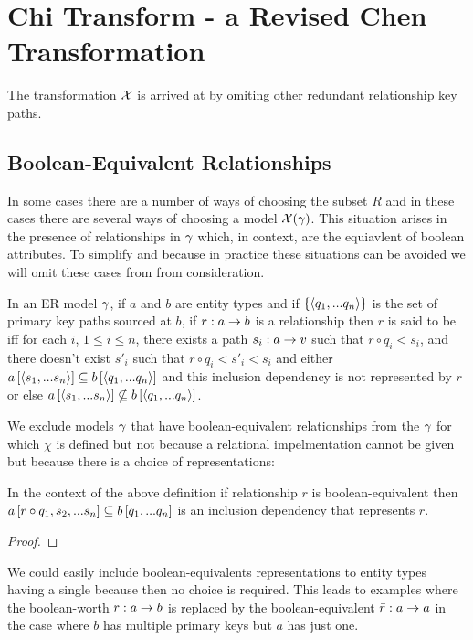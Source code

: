\section{Chi Transform - a Revised Chen Transformation}

\begin{oldtt}
The transformation $\mathcal{X}$ is arrived at by omiting other redundant relationship key paths. 
\end{oldtt}

\subsection{Boolean-Equivalent Relationships}

In some cases there are a number of ways of choosing the subset $R$ and  in these cases there are several ways of choosing
a model $\mathcal{X}(\gamma)$. This situation arises in the presence of relationships in $\gamma$ which, in context, are the equiavlent of boolean attributes. To simplify and because in practice these situations can be avoided we will omit these cases from from consideration. 
\begin{definition}
In an  ER model $\gamma$, if $a$ and $b$ are entity types and if $\left\{\langle q_1,...q_n\rangle\right\}$ is the set of primary key paths sourced at $b$, if $r: a \rightarrow b$ is a relationship then $r$ is said to be  
iff for each $i$, $1 \leq i \leq n$, there exists a path $s_i: a \rightarrow v$ such that $r \circ q_i < s_i$,
and there doesn't exist $s'_i$ such that $r \circ q_i < s'_i <s_i$ and  either
$a\left[\langle s_1,...s_n\rangle\right]\subseteq b\left[\langle q_1,...q_n\rangle\right]$ and this inclusion dependency is not represented by
$r$ or else $a\left[\langle s_1,...s_n\rangle\right]\nsubseteq b\left[\langle q_1,...q_n\rangle\right]$.
\end{definition}

We exclude models $\gamma$ that have boolean-equivalent relationships from the $\gamma$ for which $\chi$ is defined but not because a relational impelmentation cannot be given but because there is a choice of representations: 
\begin{lemma}
In the context of the above definition if relationship $r$ is boolean-equivalent
then $a\left[r \circ q_1,s_2,...s_n\right]\subseteq b\left[q_1,...q_n\right]$ is an inclusion dependency that represents $r$. 
\end{lemma}
\begin{proof}
\tbd
\end{proof}
We could easily include boolean-equivalents representations to entity types having a single  because then no choice is required.
This leads to examples where the boolean-worth $r: a \rightarrow b$ is replaced by the boolean-equivalent $\bar{r}: a \rightarrow a$ in the case where $b$ has multiple primary keys but $a$ has just one.  

